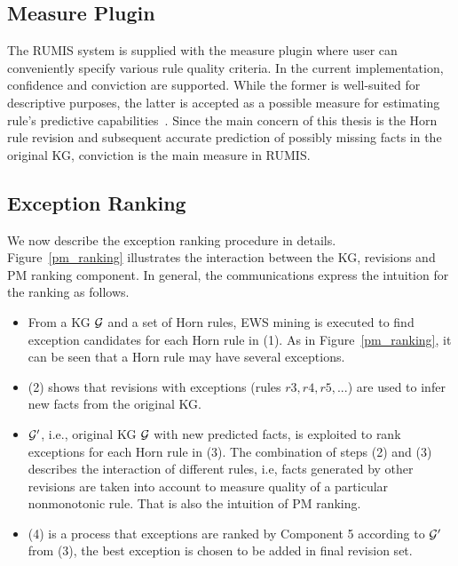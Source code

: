 \subsection{Measure Plugin}

The RUMIS system is supplied with the measure plugin where user can conveniently specify various rule quality criteria. In the current implementation, confidence and conviction are supported. While the former is well-suited for descriptive purposes, the latter is accepted as a possible measure for estimating rule's predictive capabilities~\cite{ref46}. Since the main concern of this thesis is the Horn rule revision and subsequent accurate prediction of possibly missing facts in the original KG, conviction is the main measure in RUMIS.

\subsection{Exception Ranking}
\label{intuition_er}

We now describe the exception ranking procedure in details. Figure~\ref{pm_ranking} illustrates the interaction between the KG, revisions and PM ranking component. In general, the communications express the intuition for the ranking as follows.

\begin{itemize}
\item From a KG $\mathcal{G}$ and a set of Horn rules, EWS mining is executed to find exception candidates for each Horn rule in (1). As in Figure~\ref{pm_ranking}, it can be seen that a Horn rule may have several exceptions.
\item (2) shows that revisions with exceptions (rules $r3, r4, r5, ...$) are used to infer new facts from the original KG.
\item $\mathcal{G}'$, i.e., original KG $\mathcal{G}$ with new predicted facts, is exploited to rank exceptions for each Horn rule in (3). The combination of steps (2) and (3) describes the interaction of different rules, i.e, facts generated by other revisions are taken into account to measure quality of a particular nonmonotonic rule. That is also the intuition of PM ranking.
\item (4) is a process that exceptions are ranked by Component 5 according to $\mathcal{G}'$ from (3), the best exception is chosen to be added in final revision set.
\end{itemize}

